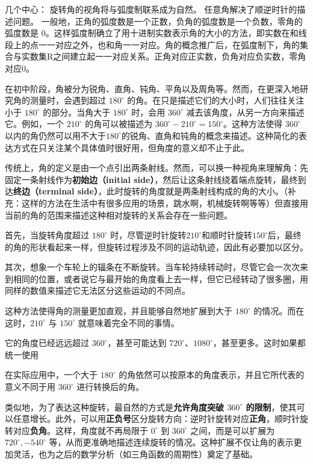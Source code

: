 几个中心：
旋转角的视角将与弧度制联系成为自然。
任意角解决了顺逆时针的描述问题。
一般地，正角的弧度数是一个正数，负角的弧度数是一个负数，零角的弧度数是 $0$。这样弧度制确立了用十进制实数表示角的大小的方法，即实数在和线段上的点一一对应之外，也和角一一对应。角的概念推广后，在弧度制下，角的集合与实数集R之间建立起一一对应关系。正角对应正实数，负角对应负实数，零角对应0。





在初中阶段，角被分为锐角、直角、钝角、平角以及周角等。然而，在更深入地研究角的测量时，会遇到超过 $180^\circ$ 的角。在只是描述它们的大小时，人们往往关注小于 $180^\circ$ 的部分。当角大于 $180^\circ$ 时，会用 $360^\circ$ 减去该角度，从另一方向来描述它。例如，一个 $210^\circ$ 的角可以被描述为 $360^\circ - 210^\circ = 150^\circ$。这种方法使得 $360^\circ$ 以内的角仍然可以用不大于$180^\circ$的锐角、直角和钝角的概念来描述。这种简化的表达方式在只关注某个具体值时很好用，但角度的意义却不止于此。

传统上，角的定义是由一个点引出两条射线。然而，可以换一种视角来理解角：先固定一条射线作为\textbf{初始边（initial side）}，然后让这条射线绕着端点旋转，最终到达\textbf{终边（terminal side）}，此时旋转的角度就是两条射线构成的角的大小。（补充：这样的方法在生活中有很多应用的场景，跳水啊，机械旋转啊等等）但直接用当前的角的范围来描述这种相对旋转的关系会存在一些问题。

首先，当旋转角度超过 $180^\circ$ 时，尽管逆时针旋转$210^\circ$和顺时针旋转$150^\circ$后，最终的角的形状看起来一样，但旋转过程涉及不同的运动轨迹，因此有必要加以区分。

其次，想象一个车轮上的辐条在不断旋转。当车轮持续转动时，尽管它会一次次来到相同的位置，或者说它与最开始的角度看上去一样，但它已经转动了很多圈，用同样的数值来描述它无法区分这些运动的不同点。




这种方法使得角的测量更加直观，并且能够自然地扩展到大于 $180^\circ$ 的情况。而在这时，$210^\circ$ 与 $150^\circ$ 就意味着完全不同的事情。

它的角度已经远远超过 $360^\circ$，甚至可能达到 $720^\circ$、$1080^\circ$，甚至更多。这时如果都统一使用

在实际应用中，一个大于 $180^\circ$ 的角依然可以按原本的角度表示，并且它所代表的意义不同于用 $360^\circ$ 进行转换后的角。


类似地，为了表达这种旋转，最自然的方式是\textbf{允许角度突破 $360^\circ$ 的限制}，使其可以任意增长。此外，可以用\textbf{正负号}区分旋转方向：逆时针旋转对应\textbf{正角}，顺时针旋转对应\textbf{负角}。这样，角度就不再局限于 $0^\circ$ 到 $360^\circ$ 之间，而是可以扩展为 $720^\circ, -540^\circ$ 等，从而更准确地描述连续旋转的情况。这种扩展不仅让角的表示更加灵活，也为之后的数学分析（如三角函数的周期性）奠定了基础。


